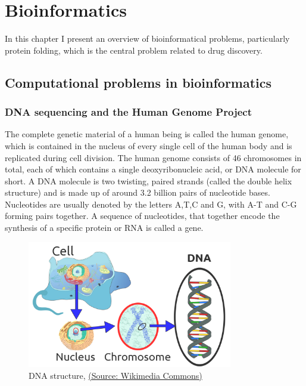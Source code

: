 \chapter{Bioinformatics}

In this chapter I present an overview of bioinformatical problems, particularly protein folding, which is the central problem related to drug discovery.\cite{BockenhauerAlgoBioinfo}

\section{Computational problems in bioinformatics}

\subsection{DNA sequencing and the Human Genome Project}

The complete genetic material of a human being is called the human genome, which is contained in the nucleus of every single cell of the human body and is replicated during cell division. The human genome consists of 46 chromosomes in total, each of which contains a single deoxyribonucleic acid, or DNA molecule for short. A DNA molecule is two twisting, paired strands (called the double helix structure) and is made up of around 3.2 billion pairs of nucleotide bases. Nucleotides are usually denoted by the letters A,T,C and G, with A-T and C-G forming pairs together. A sequence of nucleotides, that together encode the synthesis of a specific protein or RNA is called a gene.

\begin{figure}[H]
    \centering
    \includegraphics[width=0.8\textwidth]{figures/bioinformatics/dna.png}
    \caption{DNA structure, \href{https://commons.wikimedia.org/wiki/File:Eukaryote\_DNA-en.svg}{(Source: Wikimedia Commons)}}
\end{figure}

